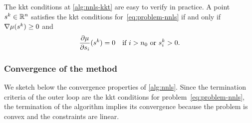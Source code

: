 The \gls{kkt} conditions at \cref{alg:nnls-kkt} are easy to verify in practice.
A point~$\sstep[k] \in \R^n$ satisfies the \gls{kkt} conditions for~\cref{eq:problem-nnls} if and only if~$\nabla \mu(\sstep[k]) \ge 0$ and
\begin{equation*}
    \frac{\partial \mu}{\partial \sstep_i} (\sstep[k]) = 0 \quad \text{if~$i > n_0$ or~$\sstep[k]_i > 0$.}
\end{equation*}


\subsubsection{Convergence of the method}

We sketch below the convergence properties of \cref{alg:nnls}.
Since the termination criteria of the outer loop are the \gls{kkt} conditions for problem~\cref{eq:problem-nnls}, the termination of the algorithm implies its convergence because the problem is convex and the constraints are linear.



